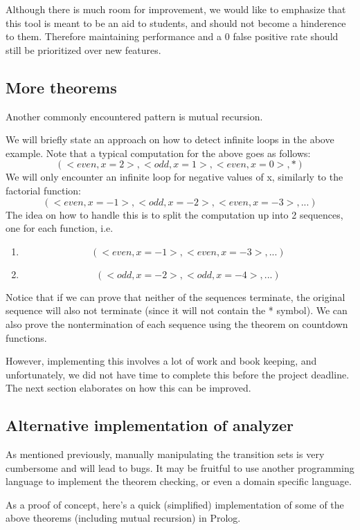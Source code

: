 Although there is much room for improvement, we would like to emphasize that this tool is meant to
be an aid to students, and should not become a hinderence to them. Therefore maintaining
performance and a 0 false positive rate should still be prioritized over new features.

\subsection{More theorems}
Another commonly encountered pattern is mutual recursion.

\begin{example}

\end{example}

We will briefly state an approach on how to detect infinite loops in the above example.
Note that a typical computation for the above goes as follows:
\[(<even, x=2>, <odd, x=1>, <even, x=0>, *)\]
We will only encounter an infinite loop for negative values of x, similarly to the factorial function:
\[(<even, x=-1>, <odd, x=-2>, <even, x=-3>, ...)\]
The idea on how to handle this is to split the computation up into 2 sequences, one for each function, i.e.
\begin{enumerate}
\item \[(<even, x=-1>, <even, x=-3>, ...)\]
\item \[(<odd, x=-2>, <odd, x=-4>, ...)\]
\end{enumerate}
Notice that if we can prove that neither of the sequences terminate, the original sequence will also not
terminate (since it will not contain the * symbol).
We can also prove the nontermination of each sequence using the theorem on countdown functions.

However, implementing this involves a lot of work and book keeping, and unfortunately, we did not have
time to complete this before the project deadline. The next section elaborates on how this can be improved.

\subsection{Alternative implementation of analyzer}
As mentioned previously, manually manipulating the transition sets is very cumbersome and will lead to bugs.
It may be fruitful to use another programming language to implement the theorem checking, or even
a domain specific language.

As a proof of concept, here's a quick (simplified) implementation of some of the above theorems (including
mutual recursion) in Prolog.

